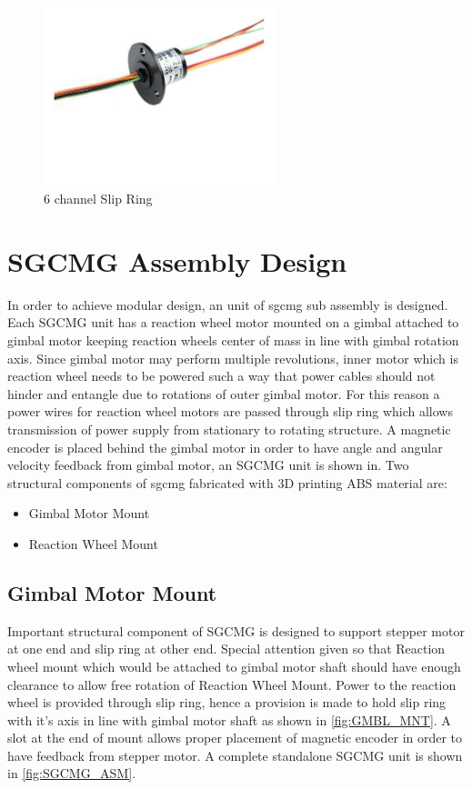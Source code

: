 \begin{figure}[ht]
    \centering
    \includegraphics[width=0.60\textwidth]{figures/Assembly/SLP_RNG.pdf}
    \caption{6 channel Slip Ring}
    \label{fig:SLP_RNG}
\end{figure}


\section{SGCMG Assembly Design}
In order to achieve modular design, an unit of \acrlong{sgcmg} sub assembly is designed. Each SGCMG unit has a reaction wheel motor mounted on a gimbal attached to gimbal motor keeping reaction wheels center of mass in line with gimbal rotation axis. Since gimbal motor may perform multiple revolutions, inner motor which is reaction wheel needs to be powered such a way that power cables should not hinder and entangle due to rotations of outer gimbal motor. For this reason a power wires for reaction wheel motors are passed through slip ring which allows transmission of power supply from stationary to rotating structure. A magnetic encoder is placed behind the gimbal motor in order to have angle and angular velocity feedback from gimbal motor, an SGCMG unit is shown in. Two structural components of \acrshort{sgcmg} fabricated with 3D printing ABS material are:
\begin{itemize}
    \item Gimbal Motor Mount
    \item Reaction Wheel Mount
\end{itemize}
\subsection{Gimbal Motor Mount}
Important structural component of SGCMG is designed to support stepper motor at one end and slip ring at other end. Special attention given so that Reaction wheel mount which would be attached to gimbal motor shaft should have enough clearance to allow free rotation of Reaction Wheel Mount. Power to the reaction wheel is provided through slip ring, hence a provision is made to hold slip ring with it's axis in line with gimbal motor shaft as shown in \autoref{fig:GMBL_MNT}. A slot at the end of mount allows proper placement of magnetic encoder in order to have feedback from stepper motor. A complete standalone SGCMG unit is shown in \autoref{fig:SGCMG_ASM}.

